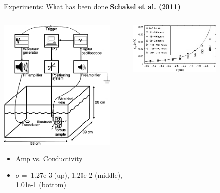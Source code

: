 \documentclass[utf8]{beamer} \usetheme{lfcr} %
\begin{document}
\begin{frame}{Experiments: What has been done}
  {\textbf{Schakel et al. (2011)}}

  \begin{columns}
    \begin{column}{0.5\textwidth}
      \includegraphics[width=0.9\textwidth]{Schakeletal2011_1}%

      \begin{itemize}
        \item {\small Amp vs. Conductivity}
        \item {\small $\sigma=$ 1.27e-3 (up), 1.20e-2 (middle), 1.01e-1 (bottom)}
      \end{itemize}

    \end{column}

    \begin{column}{0.5\textwidth}
      \includegraphics[width=0.7\textwidth]{Schakeletal2011_3}%


\end{column}
\end{columns}
\end{frame}
\end{document}
